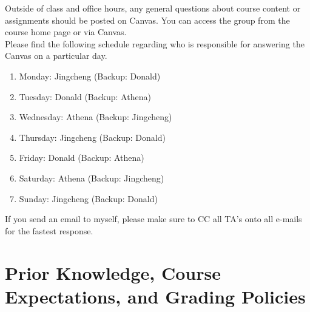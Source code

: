 \documentclass[11pt]{article}
\begin{document}
Outside of class and office hours, any general questions about course content or assignments should be posted on Canvas. You can access the group from the course home page or via Canvas.  \\

Please find the following schedule regarding who is responsible for answering the Canvas on a particular day.

\begin{enumerate}
\item Monday: Jingcheng (Backup: Donald)
\item Tuesday: Donald (Backup: Athena)
\item Wednesday: Athena (Backup: Jingcheng)
\item Thursday: Jingcheng (Backup: Donald)
\item Friday: Donald (Backup: Athena)
\item Saturday: Athena (Backup: Jingcheng)
\item Sunday: Jingcheng (Backup: Donald)
\end{enumerate}

If you send an email to myself, please make sure to CC all TA's onto all e-mails for the fastest response.\\



\section{Prior Knowledge, Course Expectations, and Grading Policies}
\end{document}
